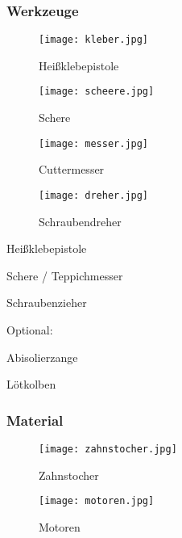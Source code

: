 \subsubsection{Werkzeuge}
\begin{figure}[h]
\centering
\parbox{5cm}{
\texttt{[image: kleber.jpg]}
\caption*{Heißklebepistole}
}
\qquad
\begin{minipage}{5cm}
\texttt{[image: scheere.jpg]}
\caption*{Schere}
\end{minipage}
\end{figure}

\begin{figure}[h]
\centering
\parbox{5cm}{
\texttt{[image: messer.jpg]}
\caption*{Cuttermesser}
}
\qquad
\begin{minipage}{5cm}
\texttt{[image: dreher.jpg]}
\caption*{Schraubendreher}
\end{minipage}
\end{figure}
\begin{checklist}
    \item Heißklebepistole
    \item Schere / Teppichmesser
    \item Schraubenzieher

    \begin{checklist}
    \item[] Optional:
    \item Abisolierzange
    \item Lötkolben
    \end{checklist}
\end{checklist}

\subsubsection{Material}

\begin{figure}[h]
\centering
\parbox{5cm}{
\texttt{[image: zahnstocher.jpg]}
\caption*{Zahnstocher}
}
\qquad
\begin{minipage}{5cm}
\texttt{[image: motoren.jpg]}
\caption*{Motoren}
\end{minipage}
\end{figure}


